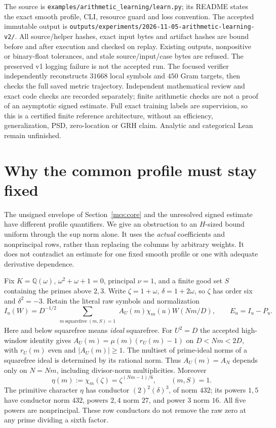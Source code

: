 \documentclass[11pt]{article}
\theoremstyle{definition}\newtheorem{definition}[theorem]{Definition}
\theoremstyle{remark}\newtheorem{remark}[theorem]{Remark}
\begin{document}
The source is \texttt{examples/}\allowbreak\texttt{arithmetic\_learning/}\allowbreak\texttt{learn.py}; its README
states the exact smooth profile, CLI, resource guard and loss convention.
The accepted immutable output is
\texttt{outputs/experiments/}\allowbreak\texttt{2026-11-05-arithmetic-learning-v2/}.
All source/helper hashes, exact input bytes and artifact hashes are bound
before and after execution and checked on replay. Existing outputs,
nonpositive or binary-float tolerances, and stale source/input/case bytes
are refused. The preserved v1 logging failure is not the accepted run.
The focused verifier independently reconstructs $31668$ local symbols and
$450$ Gram targets, then checks the full saved metric trajectory.
Independent mathematical review and exact code checks are recorded separately;
finite arithmetic checks are not a proof of an asymptotic signed estimate.
Full exact training labels are supervision, so this is a certified finite
reference architecture, without an efficiency, generalization, PSD,
zero-location or GRH claim. Analytic and categorical Lean remain unfinished.

\section{Why the common profile must stay fixed}\label{prf:core}
The unsigned envelope of Section~\ref{mcs:core} and the unresolved signed
estimate have different profile quantifiers. We give an obstruction to an
$H$-sized bound uniform through the sup norm alone. It uses the \emph{actual}
coefficients and nonprincipal rows, rather than replacing the columns by
arbitrary weights. It does not contradict an estimate for one fixed smooth
profile or one with adequate derivative dependence.

Fix $K=\mathbb Q(\omega)$, $\omega^2+\omega+1=0$, principal $\nu=1$, and a
finite good set $S$ containing the primes above $2,3$. Write
$\zeta=1+\omega$, $\delta=1+2\omega$, so $\zeta$ has order six and
$\delta^2=-3$. Retain the literal raw symbols and normalization
\[
 I_u(W)=D^{-1/2}\sum_{\substack{m\ \mathrm{squarefree}\ (m,S)=1}}
 A_U(m)\chi_m(u)W(Nm/D),\qquad E_u=I_u-P_u.
\]
Here and below squarefree means \emph{ideal} squarefree. For $U^2=D$ the
accepted high-window identity gives
$A_U(m)=\mu(m)(r_U(m)-1)$ on $D<Nm<2D$, with $r_U(m)$ even and
$|A_U(m)|\ge1$. The multiset of prime-ideal norms of a squarefree ideal
is determined by its rational norm. Thus $A_U(m)=A_N$ depends only on
$N=Nm$, including divisor-norm multiplicities. Moreover
\begin{equation}\label{prf:unit}
 \eta(m):=\chi_m(\zeta)=\zeta^{(Nm-1)/6},\qquad (m,S)=1.
\end{equation}
The primitive character $\eta$ has conductor $(2)^2(\delta)^3$, of norm
$432$; its powers $1,5$ have conductor norm $432$, powers $2,4$ norm $27$,
and power $3$ norm $16$. All five powers are nonprincipal. These row
conductors do not remove the raw zero at any prime dividing a sixth factor.
\end{document}
